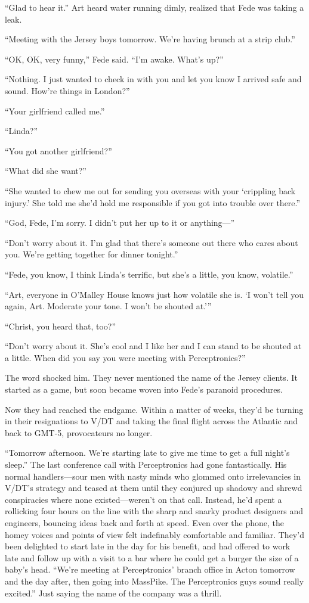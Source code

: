 “Glad to hear it.” Art heard water running dimly, realized that
Fede was taking a leak.

“Meeting with the Jersey boys tomorrow. We’re having brunch at a
strip club.”

“OK, OK, very funny,” Fede said. “I’m awake. What’s up?”

“Nothing. I just wanted to check in with you and let you know I
arrived safe and sound. How’re things in London?”

“Your girlfriend called me.”

“Linda?”

“You got another girlfriend?”

“What did she want?”

“She wanted to chew me out for sending you overseas with your
‘crippling back injury.’ She told me she’d hold me responsible if
you got into trouble over there.”

“God, Fede, I’m sorry. I didn’t put her up to it or anything—”

“Don’t worry about it. I’m glad that there’s someone out there who
cares about you. We’re getting together for dinner tonight.”

“Fede, you know, I think Linda’s terrific, but she’s a little, you
know, volatile.”

“Art, everyone in O’Malley House knows just how volatile she is. ‘I
won’t tell you again, Art. Moderate your tone. I won’t be shouted
at.’”

“Christ, you heard that, too?”

“Don’t worry about it. She’s cool and I like her and I can stand to
be shouted at a little. When did you say you were meeting with
Perceptronics?”

The word shocked him. They never mentioned the name of the Jersey
clients. It started as a game, but soon became woven into Fede’s
paranoid procedures.

Now they had reached the endgame. Within a matter of weeks, they’d
be turning in their resignations to V/DT and taking the final
flight across the Atlantic and back to GMT-5, provocateurs no
longer.

“Tomorrow afternoon. We’re starting late to give me time to get a
full night’s sleep.” The last conference call with Perceptronics
had gone fantastically. His normal handlers—sour men with nasty
minds who glommed onto irrelevancies in V/DT’s strategy and teased
at them until they conjured up shadowy and shrewd conspiracies
where none existed—weren’t on that call. Instead, he’d spent a
rollicking four hours on the line with the sharp and snarky product
designers and engineers, bouncing ideas back and forth at speed.
Even over the phone, the homey voices and points of view felt
indefinably comfortable and familiar. They’d been delighted to
start late in the day for his benefit, and had offered to work late
and follow up with a visit to a bar where he could get a burger the
size of a baby’s head. “We’re meeting at Perceptronics’ branch
office in Acton tomorrow and the day after, then going into
MassPike. The Perceptronics guys sound really excited.” Just saying
the name of the company was a thrill.

